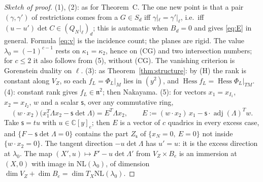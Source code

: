 \documentclass[10pt]{article}
\numberwithin{equation}{section}
\theoremstyle{remark}
\newcommand{\CC}{\mathbb{C}}
\newcommand{\NL}{\mathrm{NL}}
\newcommand{\VZ}{V_Z}
\newcommand{\Hess}{\operatorname{Hess}}
\newcommand{\adj}{\operatorname{adj}}
\begin{document}
\begin{proof}[Sketch of proof]
(1), (2): as for Theorem~C. The one new point is that a pair $(\gamma,\gamma')$ of restrictions comes from a
$G\in S_d$ iff $\gamma|_\ell=\gamma'|_\ell$, i.e.\ iff $(u-u')\det C\in(Q_N|_\ell)_d$; this is automatic when
$B_d=0$ and gives \eqref{eq:E} in general. Formula \eqref{eq:v} is the incidence count; the planes are rigid.
The value $\lambda_0=(-1)^{c-1}$ rests on $\kappa_1=\kappa_2$, hence on (CG) and two intersection numbers; for
$c\le2$ it also follows from (5), without (CG). The vanishing criterion is Gorenstein duality on $\ell$.
(3): as Theorem~\ref{thm:structure}: by (H) the rank is constant along $\VZ$, so each $f_L=\Phi_L|_M$ lies in
$(y^2)$, and $\Hess f_L=\Hess\Phi_L|_{TM}$. (4): constant rank gives $f_L\in\mathfrak n^2$; then Nakayama.
(5): for vectors $x_1=x_{I_1}$, $x_2=x_{I_2}$, $w$ and a scalar $\mathsf s$, over any commutative ring,
\begin{equation}\label{eq:id}
(w\cdot x_2)\bigl(x_1^T\Lambda x_2-\mathsf s\det\Lambda\bigr)=E^T\Lambda x_2,\qquad
E:=(w\cdot x_2)\,x_1-\mathsf s\cdot\adj(\Lambda)^Tw .
\end{equation}
Take $\mathsf s=tu$ with $u\in\CC[y]_e$; then $E$ is a vector of $c$ quadrics in every excess case, and
$\{F-\mathsf s\det\Lambda=0\}$ contains the part $Z_{\mathsf s}$ of $\{x_N=0,\ E=0\}$ not inside
$\{w\cdot x_2=0\}$. The tangent direction $-u\det\Lambda$ has $u'=u$: it is the excess direction at
$\lambda_0$. The map $(X',u)\mapsto F'-u\det\Lambda'$ from $\VZ\times B_e$ is an immersion at $(X,0)$ with image
in $\NL(\lambda_0)$, of dimension $\dim\VZ+\dim B_e=\dim T_X\NL(\lambda_0)$.
\end{proof}
\end{document}

